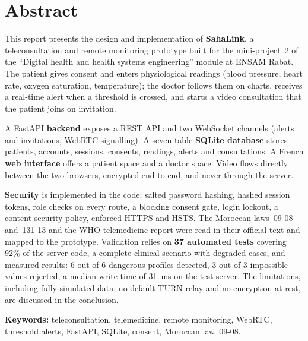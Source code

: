 \vspace{1cm}
\chapter*{Abstract}

This report presents the design and implementation of \textbf{SahaLink}, a teleconsultation and remote monitoring prototype built for the mini-project~2 of the \enquote{Digital health and health systems engineering} module at ENSAM Rabat. The patient gives consent and enters physiological readings (blood pressure, heart rate, oxygen saturation, temperature); the doctor follows them on charts, receives a real-time alert when a threshold is crossed, and starts a video consultation that the patient joins on invitation.

A FastAPI \textbf{backend} exposes a \ac{REST} \ac{API} and two WebSocket channels (alerts and invitations, WebRTC signalling). A seven-table \textbf{SQLite database} stores patients, accounts, sessions, consents, readings, alerts and consultations. A French \textbf{web interface} offers a patient space and a doctor space. Video flows directly between the two browsers, encrypted end to end, and never through the server.

\textbf{Security} is implemented in the code: salted password hashing, hashed session tokens, role checks on every route, a blocking consent gate, login lockout, a content security policy, enforced \ac{HTTPS} and \ac{HSTS}. The Moroccan laws~09-08 and~131-13 and the WHO telemedicine report were read in their official text and mapped to the prototype. Validation relies on \textbf{37 automated tests} covering 92\% of the server code, a complete clinical scenario with degraded cases, and measured results: 6 out of 6 dangerous profiles detected, 3 out of 3 impossible values rejected, a median write time of 31~ms on the test server. The limitations, including fully simulated data, no default TURN relay and no encryption at rest, are discussed in the conclusion.

\bigskip
\noindent\textbf{Keywords:} teleconsultation, telemedicine, remote monitoring, WebRTC, threshold alerts, FastAPI, SQLite, consent, Moroccan law~09-08.
